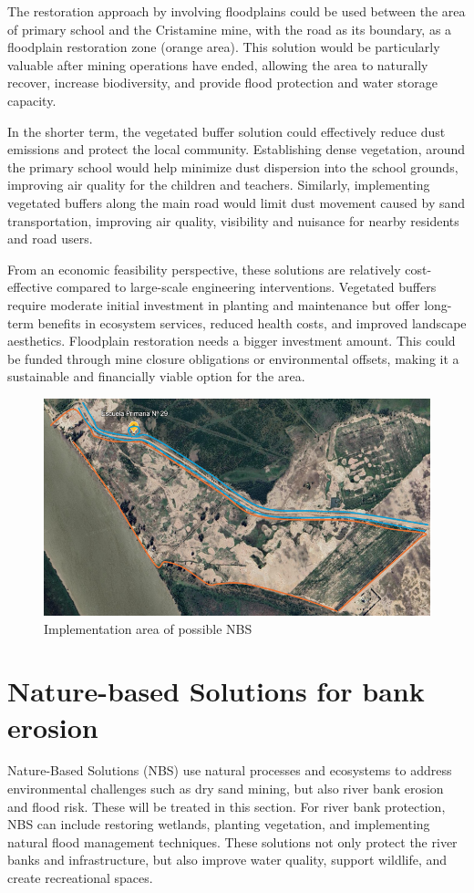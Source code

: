 The restoration approach by involving floodplains could be used between the area of primary school and the Cristamine mine, with the road as its boundary, as a floodplain restoration zone (orange area). This solution would be particularly valuable after mining operations have ended, allowing the area to naturally recover, increase biodiversity, and provide flood protection and water storage capacity.

In the shorter term, the vegetated buffer solution could effectively reduce dust emissions and protect the local community. Establishing dense vegetation, around the primary school would help minimize dust dispersion into the school grounds, improving air quality for the children and teachers.
Similarly, implementing vegetated buffers along the main road would limit dust movement caused by sand transportation, improving air quality, visibility and nuisance for nearby residents and road users.

From an economic feasibility perspective, these solutions are relatively cost-effective compared to large-scale engineering interventions. Vegetated buffers require moderate initial investment in planting and maintenance but offer long-term benefits in ecosystem services, reduced health costs, and improved landscape aesthetics. Floodplain restoration needs a bigger investment amount. This could be funded through mine closure obligations or environmental offsets, making it a sustainable and financially viable option for the area.


\begin{figure}[H]
    \centering
    \includegraphics[width=0.75\linewidth]{figures//ch8/omgevingschooltje2.png}
    \caption{Implementation area of possible NBS}
    \label{fig:PAI}
\end{figure}

\section{Nature-based Solutions for bank erosion}
Nature-Based Solutions (NBS) use natural processes and ecosystems to address environmental challenges such as dry sand mining, but also river bank erosion and flood risk. These will be treated in this section. For river bank protection, NBS can include restoring wetlands, planting vegetation, and implementing natural flood management techniques. These solutions not only protect the river banks and infrastructure, but also improve water quality, support wildlife, and create recreational spaces.


